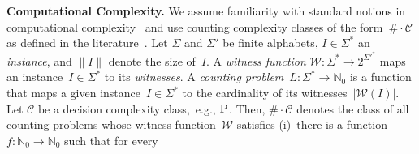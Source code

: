 \documentclass{svproc}
\newcommand{\Nat}{\mathbb{N}} %
\newcommand{\CCard}[1]{\|#1\|}
\newcommand{\Card}[1]{\left|#1\right|}
\renewcommand{\P}{\ensuremath{\textsc{P}}\xspace}
\newcommand{\WWW}{\ensuremath{\mathcal{W}}}%
\newcommand{\mtext}[1]{\ensuremath{\mathcal{#1}}}
\newcommand{\cnt}[0]{\ensuremath{\#}}
\newcommand{\cntc}[0]{\ensuremath{\cnt\cdot}}
\begin{document}
\smallskip\noindent\textbf{Computational Complexity.}
%
%
%
We assume familiarity with standard notions in
  computational complexity~\cite{Papadimitriou94} and use counting complexity classes of the form~$\cntc\mtext{C}$
  as defined in the literature~\cite{TodaWatanabe92,DurandHermannKolaitis05,HemaspaandraVollmer95a}.
%
%
%
%
%
%
%
%
Let $\Sigma$ and $\Sigma'$ be finite alphabets, $I \in \Sigma^*$ an \emph{instance}, and $\CCard{I}$
 denote the size of~$I$. %
%
%
%
%
A \emph{witness function} %
 $\mathcal{W}: \Sigma^* \rightarrow 2^{{\Sigma'}^*}$ %
maps an instance~$I \in \Sigma^*$ to its \emph{witnesses}. 
A
\emph{counting
  problem}~$L: \Sigma^* \rightarrow \Nat_0$ is a
function that maps a given instance~$I \in \Sigma^*$ to the cardinality of its
witnesses~$\Card{\WWW(I)}$.
%
%
Let $\mtext{C}$ be a decision complexity class,~e.g., \P. Then,
$\cntc\mtext{C}$ denotes the class of all counting problems whose
witness function~$\WWW$ satisfies (i)~there is a
function~$f: \Nat_0 \rightarrow \Nat_0$ such that for every
\end{document}

